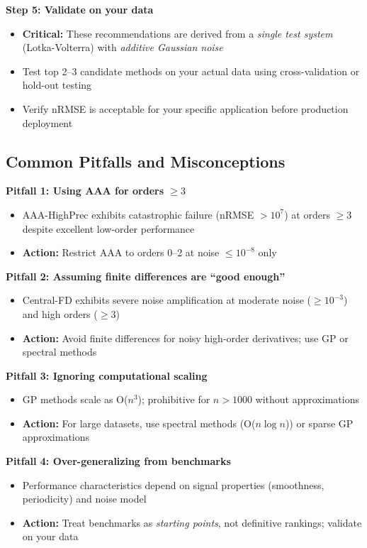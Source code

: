 \textbf{Step 5: Validate on your data}
\begin{itemize}
    \item \textbf{Critical:} These recommendations are derived from a \textit{single test system} (Lotka-Volterra) with \textit{additive Gaussian noise}
    \item Test top 2--3 candidate methods on your actual data using cross-validation or hold-out testing
    \item Verify nRMSE is acceptable for your specific application before production deployment
\end{itemize}

\subsection{Common Pitfalls and Misconceptions}
\label{sec:pitfalls}

\textbf{Pitfall 1: Using AAA for orders $\geq 3$}
\begin{itemize}
    \item AAA-HighPrec exhibits catastrophic failure (nRMSE $> 10^7$) at orders $\geq 3$ despite excellent low-order performance
    \item \textbf{Action:} Restrict AAA to orders 0--2 at noise $\leq 10^{-8}$ only
\end{itemize}

\textbf{Pitfall 2: Assuming finite differences are ``good enough''}
\begin{itemize}
    \item Central-FD exhibits severe noise amplification at moderate noise ($\geq 10^{-3}$) and high orders ($\geq 3$)
    \item \textbf{Action:} Avoid finite differences for noisy high-order derivatives; use GP or spectral methods
\end{itemize}

\textbf{Pitfall 3: Ignoring computational scaling}
\begin{itemize}
    \item GP methods scale as O($n^3$); prohibitive for $n > 1000$ without approximations
    \item \textbf{Action:} For large datasets, use spectral methods (O($n \log n$)) or sparse GP approximations
\end{itemize}

\textbf{Pitfall 4: Over-generalizing from benchmarks}
\begin{itemize}
    \item Performance characteristics depend on signal properties (smoothness, periodicity) and noise model
    \item \textbf{Action:} Treat benchmarks as \textit{starting points}, not definitive rankings; validate on your data
\end{itemize}

